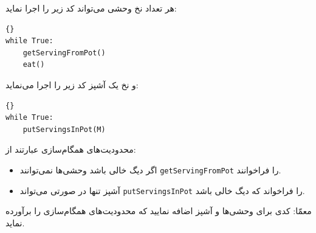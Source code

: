 \documentclass{book}
\newcommand{\clearemptydoublepage}{\newpage\cleardoublepage}
\begin{document}
    هر تعداد نخ وحشی می‌تواند کد زیر را اجرا نماید:

\begin{latin}
\begin{latin}
\begin{lstlisting}[title=\rl{کد ناهمگام یک وحشی}]{}
while True:
    getServingFromPot()
    eat()
\end{lstlisting}
\end{latin}
\end{latin}

    و نخ یک آشپز کد زیر را اجرا می‌نماید:

\begin{latin}
\begin{latin}
\begin{lstlisting}[title=\rl{کد ناهمگام آشپز}]{}
while True:
    putServingsInPot(M)
\end{lstlisting}
\end{latin}
\end{latin}

    محدودیت‌های همگام‌سازی عبارتند از:

\begin{itemize}

\item 
    اگر دیگ خالی باشد وحشی‌ها نمی‌توانند {\tt getServingFromPot}  را فراخوانند. 

\item 
    آشپز تنها در صورتی می‌تواند  {\tt putServingsInPot} را فراخواند که دیگ خالی باشد. 

\end{itemize}

    معمّا: کدی برای وحشی‌ها و آشپز اضافه نمایید که محدودیت‌های همگام‌سازی را برآورده نماید. 

\clearemptydoublepage
\end{document}
